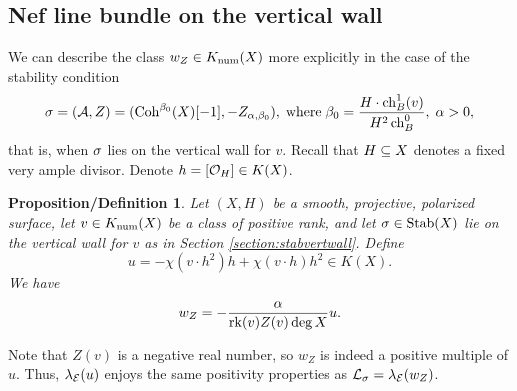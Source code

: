 \documentclass[letterpaper,11pt]{amsart}%
\newtheorem{propdef}[thm]{Proposition/Definition}
\theoremstyle{remark}
\begin{document}
\subsection{Nef line bundle on the vertical wall}
We can describe the class $w_Z \in K_{\mathrm{num}}(X)$ more explicitly in the case of the stability condition 
\[ \sigma = (\mathcal{A}, Z) = (\mathrm{Coh}^{\beta_0}(X)[-1], -Z_{\alpha, \beta_0}), \; \mathrm{where} \; \beta_0 = \frac{H \cdot \operatorname{\mathrm{ch}}_B^1(v)}{H^2 \operatorname{\mathrm{ch}}_B^0}, \; \alpha > 0, \] that is, when $\sigma$ lies on the vertical wall for $v$. Recall that $H \subseteq X$ denotes a fixed very ample divisor. Denote $h = [\mathcal{O}_H] \in K(X)$.
\begin{propdef}\label{nefclassonverticalwall}
    Let $(X,H)$ be a smooth, projective, polarized surface, let $v \in K_{\mathrm{num}}(X)$ be a class of positive rank, and let $\sigma \in \operatorname{\mathrm{Stab}}(X)$ lie on the vertical wall for $v$ as in Section \ref{section:stabvertwall}. Define 
    \[ u = -\chi(v \cdot h^2) h + \chi(v \cdot h) h^2 \in K(X). \]
    We have 
    \[ w_Z = -\frac{\alpha}{\operatorname{\mathrm{rk}}(v) Z(v) \deg X} u. \]
\end{propdef}
Note that $Z(v)$ is a negative real number, so $w_Z$ is indeed a positive multiple of $u$. Thus, $\lambda_{\mathcal{E}}(u)$ enjoys the same positivity properties as $\mathcal{L}_\sigma = \lambda_{\mathcal{E}}(w_Z)$.
\end{document}
